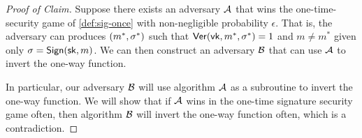 \begin{proof}[Proof of Claim]
Suppose there exists an adversary $\mathcal{A}$ that wins the 
one-time-security game of \cref{def:sig-once} with non-negligible probability $\epsilon$.
That is, the adversary can produces $(m^*, \sigma^*)$ such that $\mathsf{Ver}(\mathsf{vk}, m^*, \sigma^*) = 1$ and $m \neq m^*$ given only $\sigma = \mathsf{Sign}({\mathsf{sk}}, m)$.
We can then construct an adversary $\mathcal{B}$ that can use $\mathcal{A}$ to 
invert the one-way function.


In particular, our adversary $\mathcal{B}$ will use algorithm $\mathcal{A}$
as a subroutine to invert the one-way function.
We will show that if $\mathcal{A}$ wins in the one-time signature security
game often, then algorithm $\mathcal{B}$ will invert the one-way function
often, which is a contradiction.


\end{proof}
